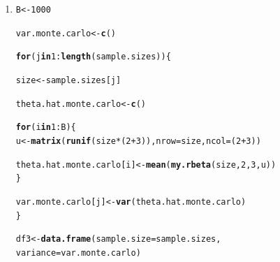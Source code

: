 \documentclass[11pt, a4paper]{article}\usepackage[]{graphicx}\usepackage[]{xcolor}
\makeatletter
\newcommand{\hlnum}[1]{\textcolor[rgb]{0.686,0.059,0.569}{#1}}%
\newcommand{\hlopt}[1]{\textcolor[rgb]{0,0,0}{#1}}%
\newcommand{\hldef}[1]{\textcolor[rgb]{0.345,0.345,0.345}{#1}}%
\newcommand{\hlkwa}[1]{\textcolor[rgb]{0.161,0.373,0.58}{\textbf{#1}}}%
\newcommand{\hlkwb}[1]{\textcolor[rgb]{0.69,0.353,0.396}{#1}}%
\newcommand{\hlkwc}[1]{\textcolor[rgb]{0.333,0.667,0.333}{#1}}%
\newcommand{\hlkwd}[1]{\textcolor[rgb]{0.737,0.353,0.396}{\textbf{#1}}}%
\newenvironment{kframe}{%
 \def\at@end@of@kframe{}%
 \ifinner\ifhmode%
  \def\at@end@of@kframe{\end{minipage}}%
  \begin{minipage}{\columnwidth}%
 \fi\fi%
 \def\FrameCommand##1{\hskip\@totalleftmargin \hskip-\fboxsep
 \colorbox{shadecolor}{##1}\hskip-\fboxsep
     \hskip-\linewidth \hskip-\@totalleftmargin \hskip\columnwidth}%
 \MakeFramed {\advance\hsize-\width
   \@totalleftmargin\z@ \linewidth\hsize
   \@setminipage}}%
 {\par\unskip\endMakeFramed%
 \at@end@of@kframe}
\newenvironment{knitrout}{}{} %
\makeatother
\begin{document}
\begin{enumerate}
\newpage

\item[\scalebox{2.0}{\twemoji{keycap: 3}}]

\begin{knitrout}
\color{fgcolor}\begin{kframe}
\begin{alltt}
\hldef{B} \hlkwb{<-} \hlnum{1000}
\end{alltt}
\end{kframe}
\end{knitrout}

\begin{knitrout}
\color{fgcolor}\begin{kframe}
\begin{alltt}
\hldef{var.monte.carlo} \hlkwb{<-} \hlkwd{c}\hldef{()}

\hlkwa{for} \hldef{(j} \hlkwa{in} \hlnum{1}\hlopt{:}\hlkwd{length}\hldef{(sample.sizes)) \{}

  \hldef{size} \hlkwb{<-} \hldef{sample.sizes[j]}

  \hldef{theta.hat.monte.carlo} \hlkwb{<-} \hlkwd{c}\hldef{()}

  \hlkwa{for} \hldef{(i} \hlkwa{in} \hlnum{1}\hlopt{:}\hldef{B) \{}
    \hldef{u} \hlkwb{<-} \hlkwd{matrix}\hldef{(}\hlkwd{runif}\hldef{(size} \hlopt{*} \hldef{(}\hlnum{2} \hlopt{+} \hlnum{3}\hldef{)),} \hlkwc{nrow} \hldef{= size,} \hlkwc{ncol} \hldef{= (}\hlnum{2} \hlopt{+} \hlnum{3}\hldef{))}

    \hldef{theta.hat.monte.carlo[i]} \hlkwb{<-} \hlkwd{mean}\hldef{(}\hlkwd{my.rbeta}\hldef{(size,} \hlnum{2}\hldef{,} \hlnum{3}\hldef{, u))}
  \hldef{\}}

  \hldef{var.monte.carlo[j]} \hlkwb{<-} \hlkwd{var}\hldef{(theta.hat.monte.carlo)}
\hldef{\}}
\end{alltt}
\end{kframe}
\end{knitrout}

\begin{knitrout}
\color{fgcolor}\begin{kframe}
\begin{alltt}
\hldef{df3} \hlkwb{<-} \hlkwd{data.frame}\hldef{(}\hlkwc{sample.size} \hldef{= sample.sizes,}
                  \hlkwc{variance} \hldef{= var.monte.carlo)}
\end{alltt}
\end{kframe}
\end{knitrout}



\end{enumerate}
\end{document}
